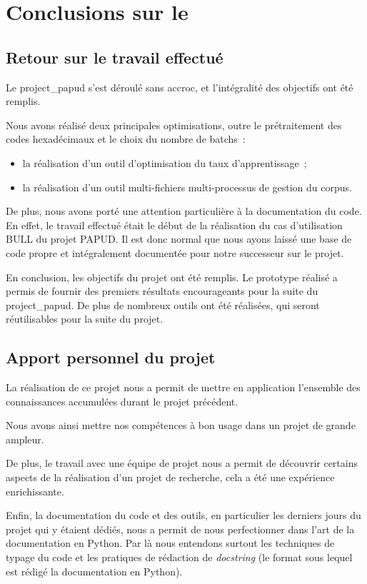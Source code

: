 \chapter{Conclusions sur le }

\section{Retour sur le travail effectué}
Le \gls{project_papud} s'est déroulé sans accroc, et l'intégralité des objectifs ont été remplis.

Nous avons réalisé deux principales optimisations, outre le prétraitement des codes hexadécimaux et le choix du nombre de \glspl{batch}~:
\begin{itemize}
	\item la réalisation d'un outil d'optimisation du taux d'apprentissage~;
	\item la réalisation d'un outil multi-fichiers multi-processus de gestion du corpus.
\end{itemize} %
\hspace{1em}

De plus, nous avons porté une attention particulière à la documentation du code.
En effet, le travail effectué était le début de la réalisation du cas d'utilisation BULL du projet PAPUD.
Il est donc normal que nous ayons laissé une base de code propre et intégralement documentée pour notre successeur sur le projet.

En conclusion, les objectifs du projet ont été remplis. Le prototype réalisé a permis de fournir des premiers résultats encourageants pour la suite du \gls{project_papud}. De plus de nombreux outils ont été réalisées, qui seront réutilisables pour la suite du projet.

\section{Apport personnel du projet}
La réalisation de ce projet nous a permit de mettre en application l'ensemble des connaissances accumulées durant le projet précédent.

Nous avons ainsi mettre nos compétences à bon usage dans un projet de grande ampleur.

De plus, le travail avec une équipe de projet nous a permit de découvrir certains aspects de la réalisation d'un projet de recherche, cela a été une expérience enrichissante.

Enfin, la documentation du code et des outils, en particulier les derniers jours du projet qui y étaient dédiés, nous a permit de nous perfectionner dans l'art de la documentation en Python.
Par là nous entendons surtout les techniques de typage du code \autocite{pep483,pep484} et les pratiques de rédaction de \textit{docstring} (le format sous lequel est rédigé la documentation en Python).

